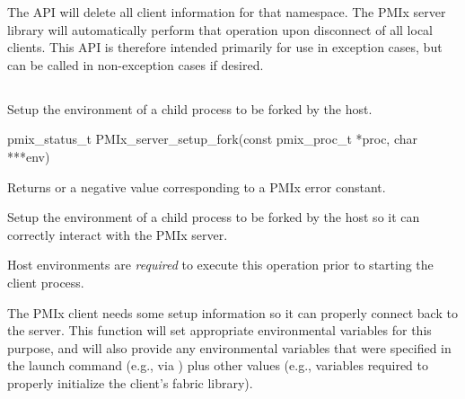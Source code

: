 \descr

The  \ac{API} will delete all client information for that namespace. The \ac{PMIx} server library will automatically perform that operation upon disconnect of all local clients.
This \ac{API} is therefore intended primarily for use in exception cases, but can be called in non-exception cases if desired.


\subsection{}

\summary

Setup the environment of a child process to be forked by the host.

\format

\cspecificstart
\begin{codepar}
pmix_status_t
PMIx_server_setup_fork(const pmix_proc_t *proc,
                        char ***env)
\end{codepar}
\cspecificend

\begin{arglist}
\end{arglist}

Returns  or a negative value corresponding to a PMIx error constant.

\descr

Setup the environment of a child process to be forked by the host so it can correctly interact with the PMIx server.

\advicermstart
Host environments are \textit{required} to execute this operation prior to starting the client process.
\advicermend

The \ac{PMIx} client needs some setup information so it can properly connect back to the server.
This function will set appropriate environmental variables for this purpose, and will also provide any environmental variables that were specified in the launch command (e.g., via ) plus other values (e.g., variables required to properly initialize the client's fabric library).


\subsection{}

